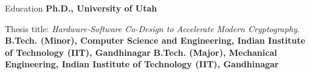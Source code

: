 \begin{rubric}{Education}
%
	\textbf{Ph.D., University of Utah}
	\par Thesis title: \emph{Hardware-Software Co-Design to Accelerate Modern Cryptography.}
%
\entry*[2013 -- 2017]%
	\textbf{B.Tech. (Minor), Computer Science and Engineering, Indian Institute of Technology (IIT), Gandhinagar}
\entry*[2013 -- 2017]%
	\textbf{B.Tech. (Major), Mechanical Engineering, Indian Institute of Technology (IIT), Gandhinagar}\par
\end{rubric}